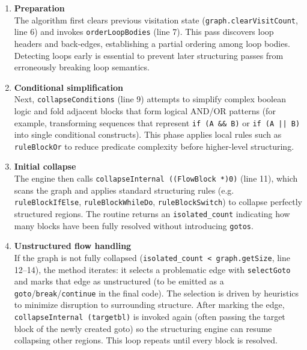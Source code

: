 \begin{enumerate}
    \item \textbf{Preparation}\\
        The algorithm first clears previous visitation state (\texttt{graph.clearVisitCount}, line 6) 
        and invokes \texttt{orderLoopBodies} (line 7). This pass discovers loop headers and 
        back-edges, establishing a partial ordering among loop bodies. 
        Detecting loops early is essential to prevent later structuring passes 
        from erroneously breaking loop semantics.

    \item \textbf{Conditional simplification}\\
        Next, \texttt{collapseConditions} (line 9) attempts to simplify complex boolean logic 
        and fold adjacent blocks that form logical AND/OR patterns (for example, 
        transforming sequences that represent \texttt{if (A \&\& B)} or \texttt{if (A || B)} 
        into single conditional constructs). This phase applies local rules such as \texttt{ruleBlockOr} 
        to reduce predicate complexity before higher-level structuring.

    \item \textbf{Initial collapse}\\
        The engine then calls \texttt{collapseInternal ((FlowBlock *)0)} (line 11), which scans the graph 
        and applies standard structuring rules (e.g. \texttt{ruleBlockIfElse}, \texttt{ruleBlockWhileDo}, 
        \texttt{ruleBlockSwitch}) to collapse perfectly structured regions. 
        The routine returns an \texttt{isolated\_count} indicating how many blocks have been 
        fully resolved without introducing \texttt{gotos}.

    \item \textbf{Unstructured flow handling}\\
        If the graph is not fully collapsed (\texttt{isolated\_count < graph.getSize}, line 12--14), 
        the method iterates: it selects a problematic edge with \texttt{selectGoto} and 
        marks that edge as unstructured (to be emitted as a \texttt{goto}/\texttt{break}/\texttt{continue} 
        in the final code). The selection is driven by heuristics  
        to minimize disruption to surrounding structure. After marking the edge, 
        \texttt{collapseInternal (targetbl)} is invoked again (often passing the target block of the newly created goto) 
        so the structuring engine can resume collapsing other regions. This loop repeats until every block 
        is resolved.
\end{enumerate}

